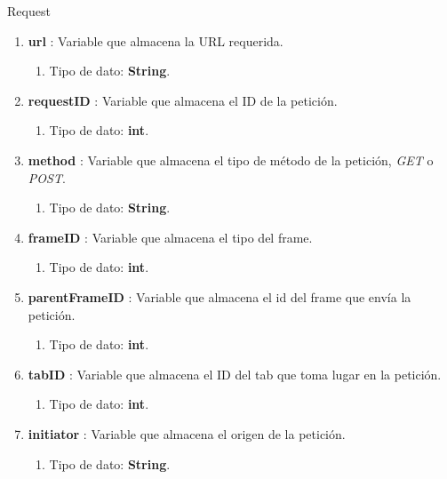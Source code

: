 \documentclass[12pt, a4paper, titlepage]{report}
\begin{document}
			    Request
			    \begin{enumerate}
    		        \item \textbf{url} : Variable que almacena la URL requerida.
    		        \begin{enumerate}
    		            \item Tipo de dato: \textbf{String}.
    		        \end{enumerate}
    		        \item \textbf{requestID} : Variable que almacena el ID de la petición.
    		        \begin{enumerate}
    		            \item Tipo de dato: \textbf{int}.
    		        \end{enumerate}
    		        \item \textbf{method} : Variable que almacena el tipo de método de la petición, \textit{GET} o \textit{POST}.
    		        \begin{enumerate}
    		            \item Tipo de dato: \textbf{String}.
    		        \end{enumerate}
    		        \item \textbf{frameID} : Variable que almacena el tipo del frame.
    		        \begin{enumerate}
    		            \item Tipo de dato: \textbf{int}.
    		        \end{enumerate}
    		        \item \textbf{parentFrameID} : Variable que almacena el id del frame que envía la petición. 
    		        \begin{enumerate}
    		            \item Tipo de dato: \textbf{int}.
    		        \end{enumerate}
    		        \item \textbf{tabID} : Variable que almacena el ID del tab que toma lugar en la petición.
    		        \begin{enumerate}
    		            \item Tipo de dato: \textbf{int}.
    		        \end{enumerate}
    		        \item \textbf{initiator} : Variable que almacena el origen de la petición.
    		        \begin{enumerate}
    		            \item Tipo de dato: \textbf{String}.

\end{enumerate}
\end{enumerate}
\end{document}
